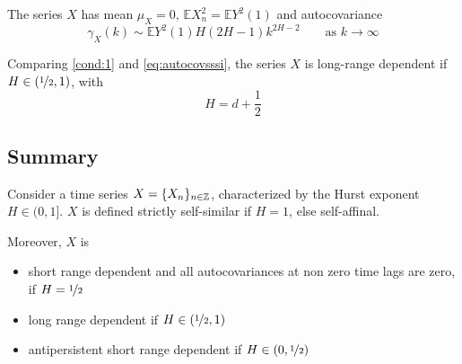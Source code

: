 The series $X$ has mean $\mu_X = 0$, $\mathbb{E}X^2_n = \mathbb{E}Y^2(1)$ and autocovariance 
\begin{equation}\label{eq:autocovsssi}
	\gamma_X(k) \sim \mathbb{E}Y^2(1) H (2H -1) k^{2H-2} \qquad \text{as $k \to \infty$}
\end{equation}

Comparing \autoref{cond:1} and \autoref{eq:autocovsssi}, the series $X$ is long-range dependent if $H \in (\nicefrac{1}{2}, 1)$, with
\begin{equation*}
	H = d + \frac{1}{2}
\end{equation*}

\subsection{Summary}
Consider a time series $X = \{X_n\}_{n \in \mathbb{Z}}$, characterized by the Hurst exponent $H \in (0, 1]$. $X$ is defined strictly self-similar if $H = 1$, else self-affinal.

Moreover, $X$ is
\begin{itemize}
	\item short range dependent and all autocovariances at non zero time lags are zero, if $H =\nicefrac{1}{2}$\cite{Beran:2304008}
	\item long range dependent if $H \in (\nicefrac{1}{2}, 1)$
	\item antipersistent short range dependent if $H \in (0, \nicefrac{1}{2})$
\end{itemize}
